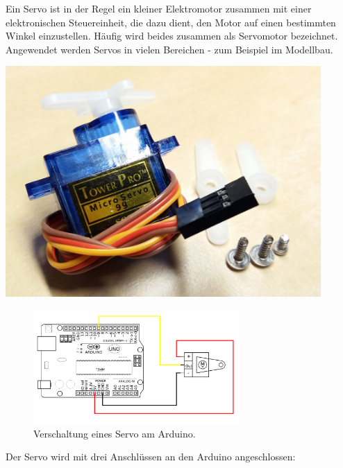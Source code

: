 \begin{minipage}{0.7\textwidth}
	Ein Servo ist in der Regel ein kleiner Elektromotor zusammen mit einer elektronischen Steuereinheit, die dazu dient, den Motor auf einen bestimmten Winkel einzustellen. Häufig wird beides zusammen als Servomotor bezeichnet. Angewendet werden Servos in vielen Bereichen - zum Beispiel im Modellbau.
\end{minipage}
\hfill
\begin{minipage}{0.28\textwidth}
	\centering
	\includegraphics[width=0.9\textwidth]{./pics/servo.png}
\end{minipage}


\begin{figure}[H]
	\centering
	\includegraphics[width=0.7\textwidth]{./Zeichnungen/schaltplan-servo.png}
	\caption{Verschaltung eines Servo am Arduino.}
\end{figure}

Der Servo wird mit drei Anschlüssen an den Arduino angeschlossen:

